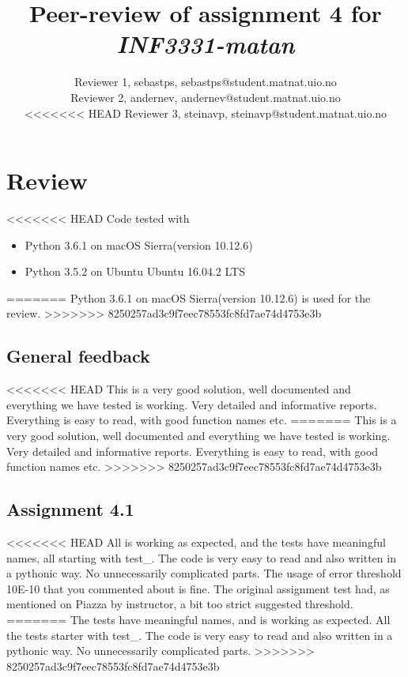 \documentclass[a4paper]{article}
\title{Peer-review of assignment 4 for \textit{INF3331-matan}}
\author{Reviewer 1, sebastps, {sebastps@student.matnat.uio.no} \\
 		Reviewer 2, andernev, {andernev@student.matnat.uio.no} \\
<<<<<<< HEAD
        Reviewer 3, steinavp, {steinavp@student.matnat.uio.no}}
\begin{document}
\maketitle

\section{Review \emph{}}\label{sec:review}

<<<<<<< HEAD
Code tested with
\begin{itemize}
	\item Python 3.6.1 on macOS Sierra(version 10.12.6)
    \item Python 3.5.2 on Ubuntu Ubuntu 16.04.2 LTS
\end{itemize}
=======
Python 3.6.1 on macOS Sierra(version 10.12.6) is used for the review.
>>>>>>> 8250257ad3c9f7eec78553fc8fd7ae74d4753e3b

\subsection*{General feedback}

<<<<<<< HEAD
This is a very good solution, well documented and everything we have tested is working. Very detailed and informative reports. Everything is easy to read, with good function names etc. 
=======
This is a very good solution, well documented and everything we have tested is working. Very detailed and informative reports. Everything is easy to read, with good function names etc.
>>>>>>> 8250257ad3c9f7eec78553fc8fd7ae74d4753e3b

\subsection*{Assignment 4.1}

<<<<<<< HEAD
All is working as expected, and the tests have meaningful names, all starting with test\_.
The code is very easy to read and also written in a pythonic way. No unnecessarily complicated parts. The usage of error threshold 10E-10 that you commented about is fine. The original assignment test had, as mentioned on Piazza by instructor, a bit too strict suggested threshold.
=======
The tests have meaningful names, and is working as expected.
All the tests starter with test\_.
The code is very easy to read and also written in a pythonic way. No unnecessarily complicated parts.
>>>>>>> 8250257ad3c9f7eec78553fc8fd7ae74d4753e3b
\end{document}
